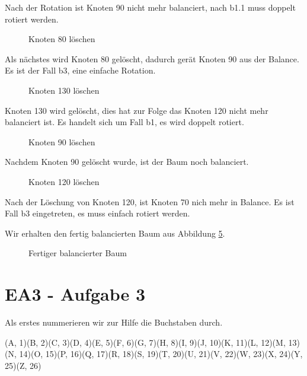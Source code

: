 \documentclass[12pt]{article}
\begin{document}
Nach der Rotation ist Knoten 90 nicht mehr balanciert, nach b1.1 muss doppelt rotiert werden.

\begin{figure}[h]
	\centering
	\scalebox{.5}{}
	\caption{Knoten 80 löschen}
	\label{fig:abb8b}
\end{figure}

Als nächstes wird Knoten 80 gelöscht, dadurch gerät Knoten 90 aus der Balance. Es ist der
Fall b3, eine einfache Rotation.

\begin{figure}[h]
	\centering
	\scalebox{.5}{}
	\caption{Knoten 130 löschen}
	\label{fig:abb9b}
\end{figure}

\newpage

Knoten 130 wird gelöscht, dies hat zur Folge das Knoten 120 nicht mehr balanciert ist. Es handelt
sich um Fall b1, es wird doppelt rotiert.


\begin{figure}[h]
	\centering
	\scalebox{.5}{}
	\caption{Knoten 90 löschen}
	\label{fig:abb10b}
\end{figure}

Nachdem Knoten 90 gelöscht wurde, ist der Baum noch balanciert.

\begin{figure}[h]
	\centering
	\scalebox{.5}{}
	\caption{Knoten 120 löschen}
	\label{fig:abb11b}
\end{figure}

Nach der Löschung von Knoten 120, ist Knoten 70 nich mehr in Balance. Es ist Fall b3 eingetreten,
es muss einfach rotiert werden.

\newpage

Wir erhalten den fertig balancierten Baum aus Abbildung \ref{fig:abb12b}.

\begin{figure}[h]
	\centering
	\scalebox{.5}{}
	\caption{Fertiger balancierter Baum}
	\label{fig:abb12b}
\end{figure}

\newpage


\section*{EA3 - Aufgabe 3}
Als erstes nummerieren wir zur Hilfe die Buchstaben durch.

(A, 1)(B, 2)(C, 3)(D, 4)(E, 5)(F, 6)(G, 7)(H, 8)(I, 9)(J, 10)(K, 11)(L, 12)(M, 13)(N, 14)(O, 15)(P, 16)(Q, 17)(R, 18)(S, 19)(T, 20)(U, 21)(V, 22)(W, 23)(X, 24)(Y, 25)(Z, 26)
\\
\end{document}
